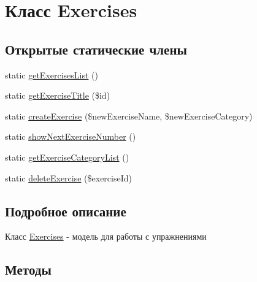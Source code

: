 \hypertarget{classExercises}{}\section{Класс Exercises}
\label{classExercises}
\subsection*{Открытые статические члены}
\begin{DoxyCompactItemize}
\item 
static \hyperlink{classExercises_a53040808f03cf242e1ef0d8fb9b717bc}{get\+Exercises\+List} ()
\item 
static \hyperlink{classExercises_aaab0c1f9284e83573b3871073e3dda89}{get\+Exercise\+Title} (\$id)
\item 
static \hyperlink{classExercises_a3c72e47117bc8bf1ecf59ccd403bf4dd}{create\+Exercise} (\$new\+Exercise\+Name, \$new\+Exercise\+Category)
\item 
static \hyperlink{classExercises_adfdfca2f7efb2ef4e84f610c8fe45683}{show\+Next\+Exercise\+Number} ()
\item 
static \hyperlink{classExercises_a1217051d300917aacfce5c95b9a7141b}{get\+Exercise\+Category\+List} ()
\item 
static \hyperlink{classExercises_aa9dfece8a8ae885921d2aa38380ff38d}{delete\+Exercise} (\$exercise\+Id)
\end{DoxyCompactItemize}


\subsection{Подробное описание}
Класс \hyperlink{classExercises}{Exercises} -\/ модель для работы с упражнениями 

\subsection{Методы}
